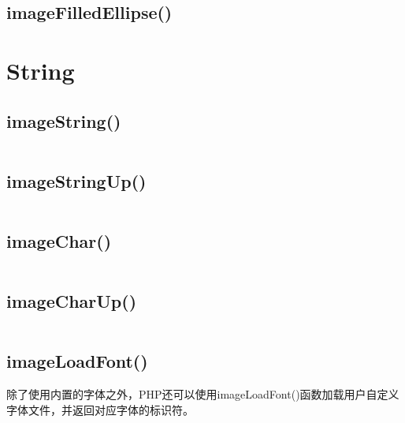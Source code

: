 \subsection{imageFilledEllipse()}



\section{String}





\subsection{imageString()}


\begin{lstlisting}[language=PHP]

\end{lstlisting}

\subsection{imageStringUp()}


\begin{lstlisting}[language=PHP]

\end{lstlisting}


\subsection{imageChar()}


\begin{lstlisting}[language=PHP]

\end{lstlisting}


\subsection{imageCharUp()}


\begin{lstlisting}[language=PHP]

\end{lstlisting}

\subsection{imageLoadFont()}


除了使用内置的字体之外，PHP还可以使用imageLoadFont()函数加载用户自定义字体文件，并返回对应字体的标识符。

